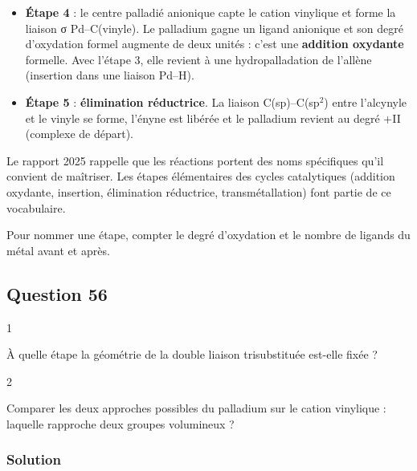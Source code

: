 \documentclass[11pt,a4paper]{article}
\providecommand{\tightlist}{\setlength{\itemsep}{0pt}\setlength{\parskip}{0pt}}
\begin{document}
\begin{itemize}
\tightlist
\item
  \textbf{Étape 4} : le centre palladié anionique capte le cation vinylique et forme la liaison σ Pd--C(vinyle). Le palladium gagne un ligand anionique et son degré d'oxydation formel augmente de deux unités : c'est une \textbf{addition oxydante} formelle. Avec l'étape 3, elle revient à une hydropalladation de l'allène (insertion dans une liaison Pd--H).
\item
  \textbf{Étape 5} : \textbf{élimination réductrice}. La liaison C(sp)--C(sp\(^2\)) entre l'alcynyle et le vinyle se forme, l'ényne est libérée et le palladium revient au degré +II (complexe de départ).
\end{itemize}

\begin{jury}

Le rapport 2025 rappelle que les réactions portent des noms spécifiques qu'il convient de maîtriser. Les étapes élémentaires des cycles catalytiques (addition oxydante, insertion, élimination réductrice, transmétallation) font partie de ce vocabulaire.

\end{jury}

\begin{methode}

Pour nommer une étape, compter le degré d'oxydation et le nombre de ligands du métal avant et après.

\end{methode}

\hypertarget{question-56}{%
\subsection{Question 56}\label{question-56}}

\begin{indication}{1}

À quelle étape la géométrie de la double liaison trisubstituée est-elle fixée ?

\end{indication}

\begin{indication}{2}

Comparer les deux approches possibles du palladium sur le cation vinylique : laquelle rapproche deux groupes volumineux ?

\end{indication}

\hypertarget{solution-55}{%
\subsubsection{Solution}\label{solution-55}}
\end{document}
